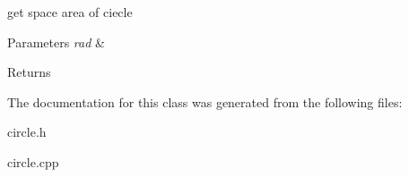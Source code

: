 get space area of ciecle 


\begin{DoxyParams}{Parameters}
{\em rad} & \\
\hline
\end{DoxyParams}
\begin{DoxyReturn}{Returns}

\end{DoxyReturn}


The documentation for this class was generated from the following files\+:\begin{DoxyCompactItemize}
\item 
circle.\+h\item 
circle.\+cpp\end{DoxyCompactItemize}
